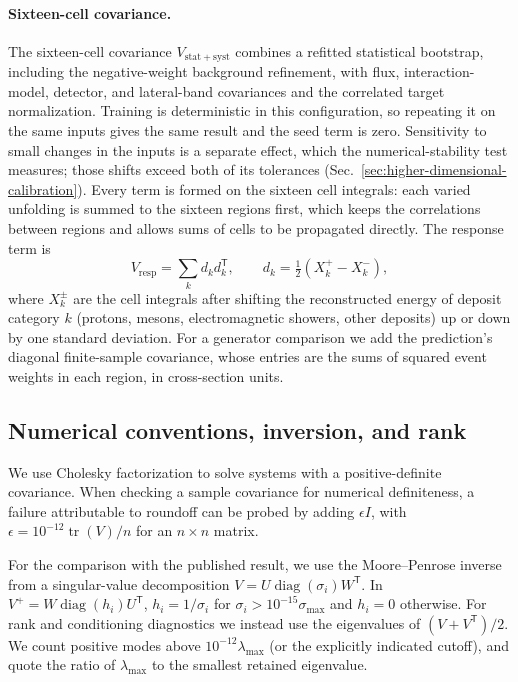 \paragraph{Sixteen-cell covariance.} The sixteen-cell covariance $V_{\mathrm{stat+syst}}$ combines a refitted statistical bootstrap, including the negative-weight background refinement, with flux, interaction-model, detector, and lateral-band covariances and the correlated target normalization. Training is deterministic in this configuration, so repeating it on the same inputs gives the same result and the seed term is zero. Sensitivity to small changes in the inputs is a separate effect, which the numerical-stability test measures; those shifts exceed both of its tolerances (Sec.~\ref{sec:higher-dimensional-calibration}). Every term is formed on the sixteen cell integrals: each varied unfolding is summed to the sixteen regions first, which keeps the correlations between regions and allows sums of cells to be propagated directly. The response term is
\begin{equation}
  V_{\mathrm{resp}}=\sum_k d_k d_k^{\mathsf T},\qquad d_k=\tfrac12\left(X_k^+-X_k^-\right),
  \label{eq:app-response-term}
\end{equation}
where $X_k^\pm$ are the cell integrals after shifting the reconstructed energy of deposit category $k$ (protons, mesons, electromagnetic showers, other deposits) up or down by one standard deviation. For a generator comparison we add the prediction's diagonal finite-sample covariance, whose entries are the sums of squared event weights in each region, in cross-section units.

\subsection{Numerical conventions, inversion, and rank}
\label{app:covariance-inversion}
\label{sec:invert}
\label{sec:rank}
\label{sec:nd-declarations}

We use Cholesky factorization to solve systems with a positive-definite covariance. When checking a sample covariance for numerical definiteness, a failure attributable to roundoff can be probed by adding $\epsilon I$, with $\epsilon=10^{-12}\operatorname{tr}(V)/n$ for an $n\times n$ matrix.

For the comparison with the published result, we use the Moore--Penrose inverse from a singular-value decomposition $V=U\operatorname{diag}(\sigma_i)W^{\mathsf T}$. In $V^+=W\operatorname{diag}(h_i)U^{\mathsf T}$, $h_i=1/\sigma_i$ for $\sigma_i>10^{-15}\sigma_{\max}$ and $h_i=0$ otherwise. For rank and conditioning diagnostics we instead use the eigenvalues of $(V+V^{\mathsf T})/2$. We count positive modes above $10^{-12}\lambda_{\max}$ (or the explicitly indicated cutoff), and quote the ratio of $\lambda_{\max}$ to the smallest retained eigenvalue.

